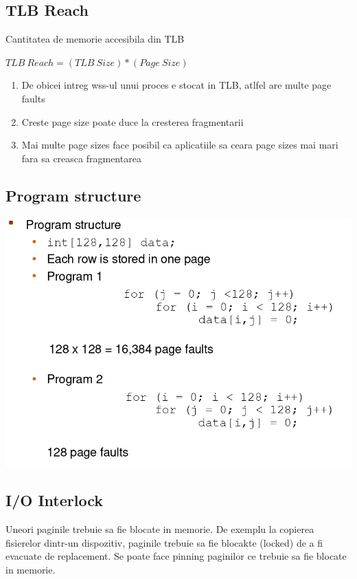 \documentclass{article}
\begin{document}
\subsection*{TLB Reach}
Cantitatea de memorie accesibila din TLB
\begin{center}
    \begin{math}
TLB\ Reach = (TLB\ Size) * (Page\ Size)
    \end{math}
\end{center}
\begin{enumerate}
    \item De obicei intreg wss-ul unui proces e stocat in TLB, atlfel are multe page faults
    \item Creste page size poate duce la cresterea fragmentarii
    \item Mai multe page sizes face posibil ca aplicatiile sa ceara page sizes mai mari fara sa creasca fragmentarea
\end{enumerate}

\subsection*{Program structure}
\begin{center}
    \includegraphics[scale=0.4]{40-progstruct.png}
\end{center}

\subsection*{I/O Interlock}
Uneori paginile trebuie sa fie blocate in memorie. De exemplu la copierea fisierelor dintr-un dispozitiv, paginile trebuie sa fie blocakte (locked) de a fi evacuate de replacement. Se poate face pinning paginilor ce trebuie sa fie blocate in memorie.
\end{document}
